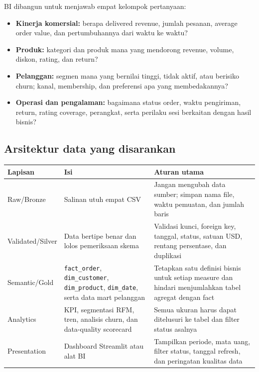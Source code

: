 \documentclass[
  indonesian,
  letterpaper,
  DIV=11,
  numbers=noendperiod]{scrreprt}
\newcounter{none} %
\providecommand{\tightlist}{%
  \setlength{\itemsep}{0pt}\setlength{\parskip}{0pt}}
\begin{document}
BI dibangun untuk menjawab empat kelompok pertanyaan:

\begin{itemize}
\tightlist
\item
  \textbf{Kinerja komersial:} berapa delivered revenue, jumlah pesanan,
  average order value, dan pertumbuhannya dari waktu ke waktu?
\item
  \textbf{Produk:} kategori dan produk mana yang mendorong revenue,
  volume, diskon, rating, dan return?
\item
  \textbf{Pelanggan:} segmen mana yang bernilai tinggi, tidak aktif,
  atau berisiko churn; kanal, membership, dan preferensi apa yang
  membedakannya?
\item
  \textbf{Operasi dan pengalaman:} bagaimana status order, waktu
  pengiriman, return, rating coverage, perangkat, serta perilaku sesi
  berkaitan dengan hasil bisnis?
\end{itemize}

\subsection*{Arsitektur data yang
disarankan}\label{arsitektur-data-yang-disarankan}

{\def\LTcaptype{none} %
\begin{longtable}[]{@{}
  >{\raggedright\arraybackslash}p{}
  >{\raggedright\arraybackslash}p{}
  >{\raggedright\arraybackslash}p{}@{}}
\toprule\noalign{}
\begin{minipage}[b]{\linewidth}\raggedright
Lapisan
\end{minipage} & \begin{minipage}[b]{\linewidth}\raggedright
Isi
\end{minipage} & \begin{minipage}[b]{\linewidth}\raggedright
Aturan utama
\end{minipage} \\
\midrule\noalign{}
\endhead
\bottomrule\noalign{}
\endlastfoot
Raw/Bronze & Salinan utuh empat CSV & Jangan mengubah data sumber;
simpan nama file, waktu pemuatan, dan jumlah baris \\
Validated/Silver & Data bertipe benar dan lolos pemeriksaan skema &
Validasi kunci, foreign key, tanggal, status, satuan USD, rentang
persentase, dan duplikasi \\
Semantic/Gold & \texttt{fact\_order}, \texttt{dim\_customer},
\texttt{dim\_product}, \texttt{dim\_date}, serta data mart pelanggan &
Tetapkan satu definisi bisnis untuk setiap measure dan hindari
menjumlahkan tabel agregat dengan fact \\
Analytics & KPI, segmentasi RFM, tren, analisis churn, dan data-quality
scorecard & Semua ukuran harus dapat ditelusuri ke tabel dan filter
status asalnya \\
Presentation & Dashboard Streamlit atau alat BI & Tampilkan periode,
mata uang, filter status, tanggal refresh, dan peringatan kualitas
data \\
\end{longtable}
}
\end{document}
